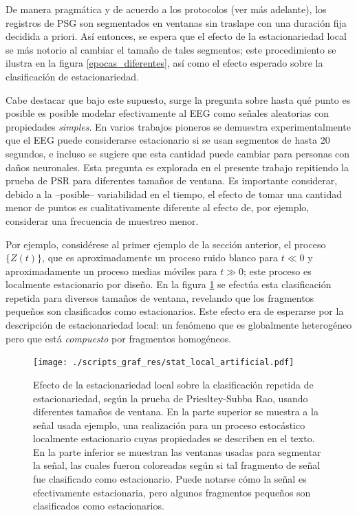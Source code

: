 \documentclass[12pt,letterpaper]{book}
\begin{document}
De manera pragmática y de acuerdo a los protocolos (ver más adelante), los registros de PSG son segmentados en ventanas sin traslape con una duración fija decidida a priori.
%
Así entonces, se espera que el efecto de la estacionariedad local se más notorio al cambiar el tamaño de tales segmentos; este procedimiento se ilustra en la figura \ref{epocas_diferentes}, así como el efecto esperado sobre la clasificación de estacionariedad.


Cabe destacar que bajo este supuesto, surge la pregunta sobre hasta qué punto es posible es posible modelar efectivamente al EEG como señales aleatorias con propiedades \textit{simples}.
%
En varios trabajos pioneros \cite{Cohen77,Kawabata73,McEwen75,Sugimoto78} se demuestra experimentalmente que el EEG puede considerarse estacionario si se usan segmentos de hasta 20 segundos, e incluso se sugiere que esta cantidad puede cambiar para personas con daños neuronales.
%
Esta pregunta es explorada en el presente trabajo repitiendo la prueba de PSR para diferentes tamaños de ventana.
%
Es importante considerar, debido a la --posible-- variabilidad en el tiempo, el efecto de tomar una cantidad menor de puntos es cualitativamente diferente al efecto de, por ejemplo, considerar una frecuencia de muestreo menor.

Por ejemplo, considérese al primer ejemplo de la sección anterior, el proceso $\{Z(t)\}$, que es aproximadamente un proceso ruido blanco para $t\ll 0$ y aproximadamente un proceso medias móviles para $t \gg 0$; este proceso es localmente estacionario por diseño.
%
En la figura \ref{lazy_fin} se efectúa esta clasificación repetida para diversos tamaños de ventana, revelando que los fragmentos pequeños son clasificados como estacionarios.
%
Este efecto era de esperarse por la descripción de estacionariedad local: un fenómeno que es globalmente heterogéneo pero que está \textit{compuesto} por fragmentos homogéneos.

\begin{figure}
\centering
\texttt{[image: ./scripts\_graf\_res/stat\_local\_artificial.pdf]}
\caption[Efecto de la estacionariedad local sobre la clasificación repetida de estacionariedad, según la prueba de Priesltey-Subba Rao, usando diferentes tamaños de ventana.]{Efecto de la estacionariedad local sobre la clasificación repetida de estacionariedad, según la prueba de Priesltey-Subba Rao, usando diferentes tamaños de ventana.
%
En la parte superior se muestra a la señal usada ejemplo, una realización para un proceso estocástico localmente estacionario cuyas propiedades se describen en el texto.
%
En la parte inferior se muestran las ventanas usadas para segmentar la señal, las cuales fueron coloreadas según si tal fragmento de señal fue clasificado como estacionario.
%
Puede notarse cómo la señal es efectivamente estacionaria, pero algunos fragmentos pequeños son clasificados como estacionarios.
}
\label{lazy_fin}
\end{figure}
\end{document}
